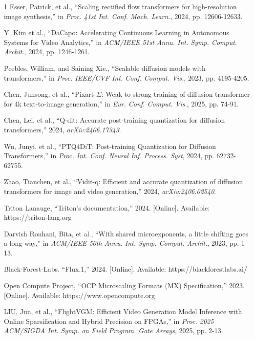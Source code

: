 \vspace{-0.3cm}

\begin{thebibliography}{1}
\vspace{-0.15cm}
Esser, Patrick, et al., ``Scaling rectified flow transformers for high-resolution image synthesis,'' in \textit{Proc. 41st Int. Conf. Mach. Learn.}, 2024, pp. 12606-12633.  

Y. Kim et al., ``DaCapo: Accelerating Continuous Learning in Autonomous Systems for Video Analytics,'' in \textit{ACM/IEEE 51st Annu. Int. Symp. Comput. Archit.}, 2024, pp. 1246-1261.

Peebles, William, and Saining Xie., ``Scalable diffusion models with transformers,'' in \textit{Proc. IEEE/CVF Int. Conf. Comput. Vis.}, 2023, pp. 4195-4205.

Chen, Junsong, et al., ``Pixart-$\Sigma$: Weak-to-strong training of diffusion transformer for 4k text-to-image generation,'' in \textit{Eur. Conf. Comput. Vis.}, 2025, pp. 74-91.

Chen, Lei, et al., ``Q-dit: Accurate post-training quantization for diffusion transformers,'' 2024, \textit{arXiv:2406.17343}.

Wu, Junyi, et al., ``PTQ4DiT: Post-training Quantization for Diffusion Transformers,'' in \textit{Proc. Int. Conf.
Neural Inf. Process. Syst}, 2024, pp. 62732-62755.

Zhao, Tianchen, et al., ``Vidit-q: Efficient and accurate quantization of diffusion transformers for image and video generation,'' 2024, \textit{arXiv:2406.02540}.

Triton Lanauge, ``Triton's documentation,'' 2024. [Online]. Available: https://triton-lang.org

Darvish Rouhani, Bita, et al., ``With shared microexponents, a little shifting goes a long way,'' in \textit{ACM/IEEE 50th Annu. Int. Symp. Comput. Archit.}, 2023, pp. 1-13.

Black-Forest-Labs. ``Flux.1,'' 2024. [Online]. Available: https://blackforestlabs.ai/

Open Compute Project, ``OCP Microscaling Formats (MX) Specification,'' 2023. [Online]. Available: https://www.opencompute.org

LIU, Jun, et al., ``FlightVGM: Efficient Video Generation Model Inference with Online Sparsification and Hybrid Precision on FPGAs,'' in \textit{Proc. 2025 ACM/SIGDA Int. Symp. on Field Program. Gate Arrays}, 2025, pp. 2-13.


\end{thebibliography}
